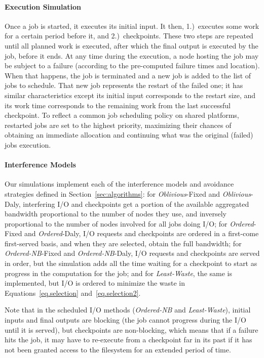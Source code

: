 \documentclass[two]{article}
\newcommand{\nocoop}{\emph{Oblivious}\xspace}
\newcommand{\fifoblock}{\emph{Ordered}\xspace}
\newcommand{\fifononblock}{\emph{Ordered-NB}\xspace}
\newcommand{\leastwaste}{\emph{Least-Waste}\xspace}
\def\propfixed{\nocoop-Fixed\xspace}
\def\propdaly{\nocoop-Daly\xspace}
\def\bfifofixed{\fifoblock-Fixed\xspace}
\def\bfifodaly{\fifoblock-Daly\xspace}
\def\fifofixed{\fifononblock-Fixed\xspace}
\def\fifodaly{\fifononblock-Daly\xspace}
\def\cooperative{\leastwaste}
\begin{document}
\paragraph*{Execution Simulation}

Once a job is started, it executes its initial input. It then, 1.)~executes
some work for a certain period before it, and 2.)~checkpoints. These two steps
are repeated until all planned work is executed, after which the final output
is executed by the job, before it ends.  At any time during the execution, a
node hosting the job may be subject to a failure (according to the pre-computed
failure times and location). When that happens, the job is terminated and a new
job is added to the list of jobs to schedule. That new job represents the
restart of the failed one; it has similar characteristics except its initial
input corresponds to the restart size, and its work time corresponds to the
remaining work from the last successful checkpoint. To reflect a common job
scheduling policy on shared platforms, restarted jobs are set to the highest
priority, maximizing their chances of obtaining an immediate allocation and
continuing what was the original (failed) jobs execution.


\paragraph*{Interference Models} Our simulations implement each of the
interference models and avoidance strategies defined in
Section~\ref{sec:algorithms}: for \propfixed and \propdaly,
interfering I/O and checkpoints get a portion of the available
aggregated bandwidth proportional to the number of nodes they use, and
inversely proportional to the number of nodes involved for all
jobs doing I/O; for \bfifofixed and \bfifodaly, I/O requests
and checkpoints are ordered in a first-come first-served basis, and
when they are selected, obtain the full bandwidth; for \fifofixed and
\fifodaly, I/O requests and checkpoints are served in order, but the
simulation adds all the time waiting for a checkpoint to start as
progress in the computation for the job; and for \cooperative,
the same is implemented, but I/O is ordered to minimize the waste in
Equations~\eqref{eq.selection} and~\eqref{eq.selection2}.

Note that in the scheduled I/O methods (\fifononblock and \cooperative),
initial inputs and final outputs are blocking (the job cannot progress during
the I/O until it is served), but checkpoints are non-blocking, which means that
if a failure hits the job, it may have to re-execute from a checkpoint far in
its past if it has  not been granted access to the filesystem for an extended
period of time.
\end{document}
